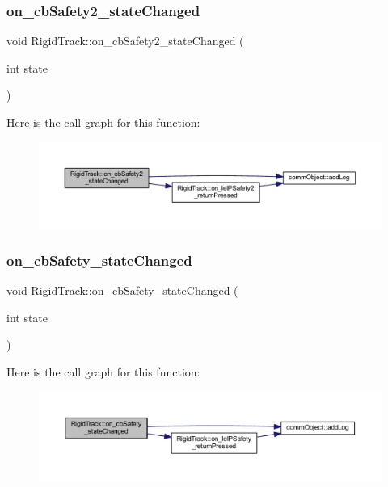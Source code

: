 \subsubsection{on\+\_\+cb\+Safety2\+\_\+state\+Changed}
{\footnotesize\ttfamily void Rigid\+Track\+::on\+\_\+cb\+Safety2\+\_\+state\+Changed (\begin{DoxyParamCaption}\item[{int}]{state }\end{DoxyParamCaption})\hspace{0.3cm}{\ttfamily [slot]}}

Here is the call graph for this function\+:\nopagebreak
\begin{figure}[H]
\begin{center}
\leavevmode
\includegraphics[width=350pt]{class_rigid_track_ad6ba1cfe25f18ff0d9f5993aafa36d16_cgraph}
\end{center}
\end{figure}
\mbox{\label{class_rigid_track_a8f999fa968f4cc9fa548bdc8438b32c4}} 
\subsubsection{on\+\_\+cb\+Safety\+\_\+state\+Changed}
{\footnotesize\ttfamily void Rigid\+Track\+::on\+\_\+cb\+Safety\+\_\+state\+Changed (\begin{DoxyParamCaption}\item[{int}]{state }\end{DoxyParamCaption})\hspace{0.3cm}{\ttfamily [slot]}}

Here is the call graph for this function\+:\nopagebreak
\begin{figure}[H]
\begin{center}
\leavevmode
\includegraphics[width=350pt]{class_rigid_track_a8f999fa968f4cc9fa548bdc8438b32c4_cgraph}
\end{center}
\end{figure}
\mbox{\label{class_rigid_track_ae5e44de9f4e3cacdd647c0305936b02b}} 
